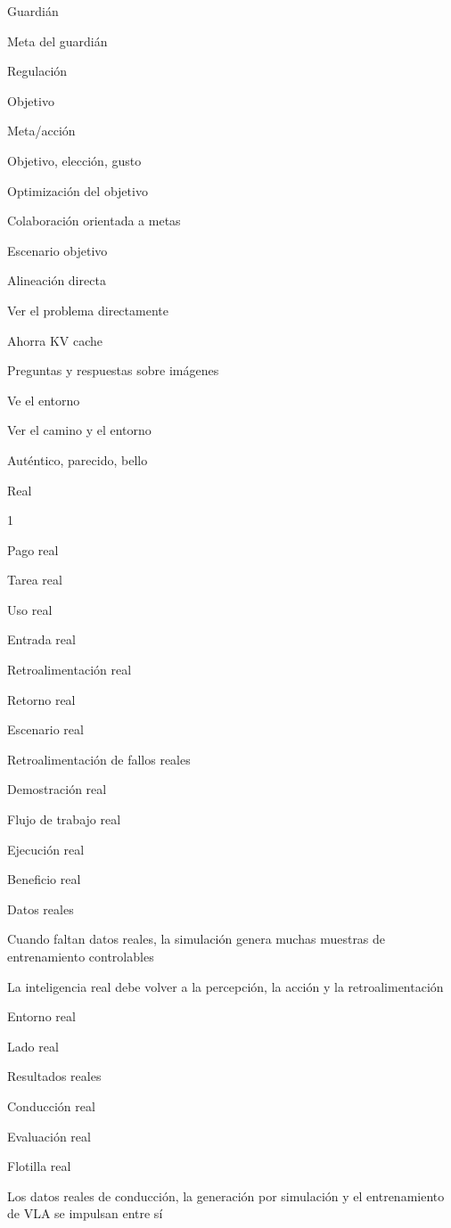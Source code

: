 \documentclass{article}
\begin{document}
Guardián

Meta del guardián

Regulación

Objetivo

Meta/acción

Objetivo, elección, gusto

Optimización del objetivo

Colaboración orientada a metas

Escenario objetivo

Alineación directa

Ver el problema directamente

Ahorra KV cache

Preguntas y respuestas sobre imágenes

Ve el entorno

Ver el camino y el entorno

Auténtico, parecido, bello

Real

1%

Pago real

Tarea real

Uso real

Entrada real

Retroalimentación real

Retorno real

Escenario real

Retroalimentación de fallos reales

Demostración real

Flujo de trabajo real

Ejecución real

Beneficio real

Datos reales

Cuando faltan datos reales, la simulación genera muchas muestras de entrenamiento controlables

La inteligencia real debe volver a la percepción, la acción y la retroalimentación

Entorno real

Lado real

Resultados reales

Conducción real

Evaluación real

Flotilla real

Los datos reales de conducción, la generación por simulación y el entrenamiento de VLA se impulsan entre sí
\end{document}
